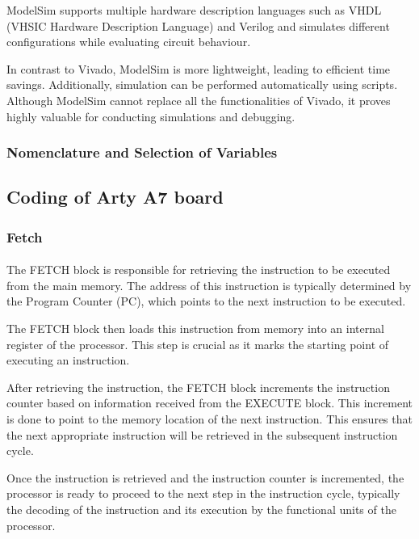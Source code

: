\documentclass{article}
\begin{document}
ModelSim supports multiple hardware description languages such as VHDL (VHSIC Hardware Description Language) and Verilog and simulates different configurations while evaluating circuit behaviour.

In contrast to Vivado, ModelSim is more lightweight, leading to efficient time savings. Additionally, simulation can be performed automatically using scripts. Although ModelSim cannot replace all the functionalities of Vivado, it proves highly valuable for conducting simulations and debugging.


\subsubsection{Nomenclature and Selection of Variables}

\subsection{Coding of Arty A7 board}

\subsubsection{Fetch}

\paragraph{}The FETCH block is responsible for retrieving the instruction to be executed from the main memory. The address of this instruction is typically determined by the Program Counter (PC), which points to the next instruction to be executed.

The FETCH block then loads this instruction from memory into an internal register of the processor. This step is crucial as it marks the starting point of executing an instruction.

After retrieving the instruction, the FETCH block increments the instruction counter based on information received from the EXECUTE block. This increment is done to point to the memory location of the next instruction. This ensures that the next appropriate instruction will be retrieved in the subsequent instruction cycle.

Once the instruction is retrieved and the instruction counter is incremented, the processor is ready to proceed to the next step in the instruction cycle, typically the decoding of the instruction and its execution by the functional units of the processor.
\end{document}
